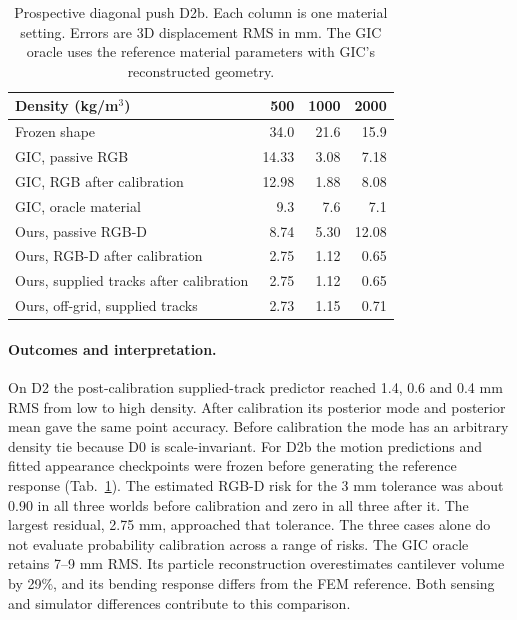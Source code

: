 \begin{table}[t]
\centering\small
\caption{Prospective diagonal push D2b. Each column is one material setting. Errors are 3D displacement RMS in mm. The GIC oracle uses the reference material parameters with GIC's reconstructed geometry.}
\label{tab:supp-d2b}
\setlength{\tabcolsep}{3.2pt}
\begin{tabular}{lrrr}
\toprule
Density (kg/m$^3$) & 500 & 1000 & 2000\\
\midrule
Frozen shape & 34.0 & 21.6 & 15.9\\
GIC, passive RGB & 14.33 & 3.08 & 7.18\\
GIC, RGB after calibration & 12.98 & 1.88 & 8.08\\
GIC, oracle material & 9.3 & 7.6 & 7.1\\
Ours, passive RGB-D & 8.74 & 5.30 & 12.08\\
Ours, RGB-D after calibration & 2.75 & 1.12 & 0.65\\
Ours, supplied tracks after calibration & 2.75 & 1.12 & 0.65\\
Ours, off-grid, supplied tracks & 2.73 & 1.15 & 0.71\\
\bottomrule
\end{tabular}
\end{table}

\paragraph{Outcomes and interpretation.}
On D2 the post-calibration supplied-track predictor reached 1.4, 0.6 and 0.4 mm RMS from low to high density. After calibration its posterior mode and posterior mean gave the same point accuracy. Before calibration the mode has an arbitrary density tie because D0 is scale-invariant. For D2b the motion predictions and fitted appearance checkpoints were frozen before generating the reference response (Tab.~\ref{tab:supp-d2b}). The estimated RGB-D risk for the 3 mm tolerance was about 0.90 in all three worlds before calibration and zero in all three after it. The largest residual, 2.75 mm, approached that tolerance. The three cases alone do not evaluate probability calibration across a range of risks. The GIC oracle retains 7--9 mm RMS. Its particle reconstruction overestimates cantilever volume by 29\%, and its bending response differs from the FEM reference. Both sensing and simulator differences contribute to this comparison.

